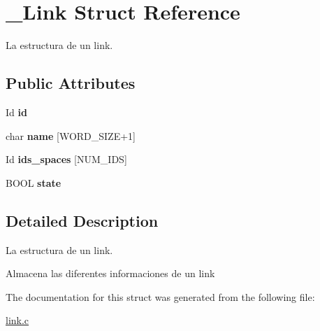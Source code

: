 \hypertarget{struct__Link}{}\section{\+\_\+\+Link Struct Reference}
\label{struct__Link}


La estructura de un link.  


\subsection*{Public Attributes}
\begin{DoxyCompactItemize}
\item 
\mbox{\label{struct__Link_a151212e7a8e8274c2a1ee991ba95878b}} 
Id {\bfseries id}
\item 
\mbox{\label{struct__Link_a020ee863120055b29609157b9de3c84d}} 
char {\bfseries name} \mbox{[}W\+O\+R\+D\+\_\+\+S\+I\+ZE+1\mbox{]}
\item 
\mbox{\label{struct__Link_ade6ef71a56538a05c455bf745c188133}} 
Id {\bfseries ids\+\_\+spaces} \mbox{[}N\+U\+M\+\_\+\+I\+DS\mbox{]}
\item 
\mbox{\label{struct__Link_a82cc94a1764a428c2eaaa6ef60fb3949}} 
B\+O\+OL {\bfseries state}
\end{DoxyCompactItemize}


\subsection{Detailed Description}
La estructura de un link. 

Almacena las diferentes informaciones de un link 

The documentation for this struct was generated from the following file\+:\begin{DoxyCompactItemize}
\item 
\hyperlink{link_8c}{link.\+c}\end{DoxyCompactItemize}
